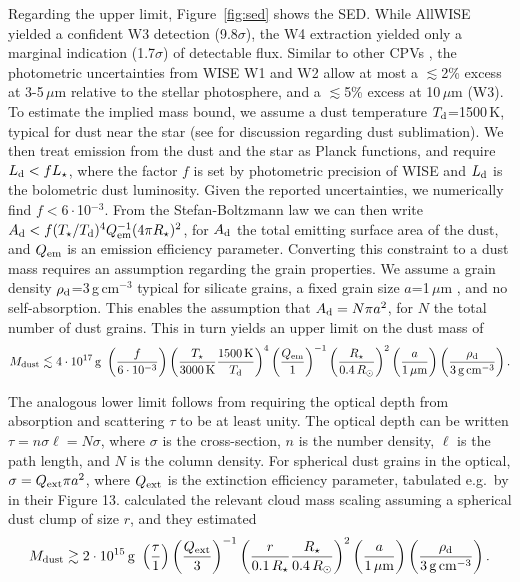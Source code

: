 \documentclass{nature3}
\begin{document}
\begin{methods}
Regarding the upper limit, Figure~\ref{fig:sed} shows the SED.  While
AllWISE \cite{Cutri2014} yielded a confident W3 detection
(9.8$\sigma$), the W4 extraction yielded only a marginal indication
(1.7$\sigma$) of detectable flux.  Similar to other CPVs
\cite{Stauffer2017,Bouma2024}, the photometric uncertainties from WISE
W1 and W2 allow at most a $\lesssim$2\% excess at 3-5\,$\mu$m relative
to the stellar photosphere, and a $\lesssim$5\% excess at 10\,$\mu$m
(W3).  To estimate the implied mass bound, we assume a dust
temperature $T_{\rm d}$=1500\,K, typical for dust near the star (see
\cite{Zhan2019} for discussion regarding dust sublimation).  We then
treat emission from the dust and the star as Planck functions, and
require $L_{\rm d} < f L_\star$, where the factor $f$ is set by
photometric precision of WISE and $L_{\rm d}$ is the bolometric dust
luminosity.  Given the reported uncertainties, we numerically find
$f<6\cdot$10$^{-3}$.  From the Stefan-Boltzmann law we can then write
$A_{\rm d} < f (T_\star / T_{\rm d})^4 Q_{\rm em}^{-1} (4\pi
R_\star)^2$, for $A_{\rm d}$ the total emitting surface area of the
dust, and $Q_{\rm em}$ is an emission efficiency parameter.
Converting this constraint to a dust mass requires an assumption
regarding the grain properties.  We assume a grain density $\rho_{\rm
d}$=3\,g\,cm$^{-3}$ typical for silicate grains, a fixed grain size
$a$=1\,$\mu$m \cite{Tanimoto2020,Gunther2022,Koen2023}, and no
self-absorption.  This enables the assumption that $A_{\rm d} = N \pi
a^2$, for $N$ the total number of dust grains.  This in turn yields an
upper limit on the dust mass of
\begin{equation}
  M_{\rm dust} \lesssim 4 \cdot 10^{17}\, {\rm g}\ 
  \left( \frac{f}{6\cdot10^{-3}} \right)
  \left( \frac{T_\star}{3000\,{\rm K}} \frac{1500\,{\rm K}}{T_{\rm d}} \right)^4
  \left( \frac{Q_{\rm em}}{1} \right)^{-1}
  \left( \frac{R_\star}{0.4\,R_\odot} \right)^2
  \left( \frac{a}{1\,\mathrm{\mu m}} \right)
  \left( \frac{\rho_{\rm d}}{3\,\mathrm{g\,cm^{-3}}} \right).
\end{equation}

The analogous lower limit follows from requiring the optical depth
from absorption and scattering $\tau$ to be at least unity.  The
optical depth can be written $\tau = n \sigma \ell = N \sigma$, where
$\sigma$ is the cross-section, $n$ is the number density, $\ell$ is
the path length, and $N$ is the column density.  For spherical dust
grains in the optical, $\sigma = Q_{\rm ext} \pi a^2$, where $Q_{\rm
ext}$ is the extinction efficiency parameter, tabulated e.g.~by
\cite{Croll2014} in their Figure 13.  \cite{Sanderson2023} calculated
the relevant cloud mass scaling assuming a spherical dust clump of
size $r$, and they estimated
\begin{equation}
  M_{\rm dust} \gtrsim 2 \cdot 10^{15}\, {\rm g}\ 
  \left( \frac{\tau}{1} \right)
  \left( \frac{Q_{\rm ext}}{3} \right)^{-1}
  \left( \frac{r}{0.1\,R_\star} \frac{R_\star}{0.4\,R_\odot} \right)^2
  \left( \frac{a}{1\,\mathrm{\mu m}} \right)
  \left( \frac{\rho_{\rm d}}{3\,\mathrm{g\,cm^{-3}}} \right).
\end{equation}


\end{methods}
\end{document}
